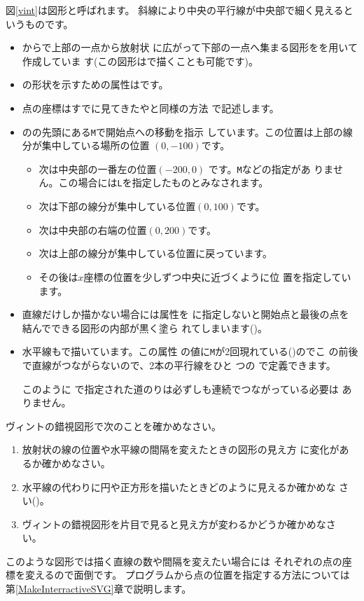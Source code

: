 図\ref{vint}は図形と呼ばれます。
斜線により中央の平行線が中央部で細く見えるというものです。
\begin{itemize}
 \item {}からで上部の一点から放射状
       に広がって下部の一点へ集まる図形をを用いて作成していま
       す(この図形はで描くことも可能です)。
 \item {}の形状を示すための属性はです。
 \item 点の座標はすでに見てきたやと同様の方法
       で記述します。
 \item {}のの先頭にある\texttt{M}で開始点への移動を指示
       しています。この位置は上部の線分が集中している場所の位置
       $(0,-100)$です。
\begin{itemize}
 \item 次は中央部の一番左の位置$(-200,0)$ です。\texttt{M}などの指定があ
       りません。この場合には\texttt{L}を指定したものとみなされます。
 \item 次は下部の線分が集中している位置$(0,100)$です。
 \item 次は中央部の右端の位置$(0,200)$です。
 \item 次は上部の線分が集中している位置に戻っています。
 \item その後は$x$座標の位置を少しずつ中央に近づくように位
       置を指定しています。
\end{itemize}
 \item 直線だけしか描かない場合には属性を
       に指定しないと開始点と最後の点を結んでできる図形の内部が黒く塗ら
       れてしまいます()。
       
 \item 水平線もで描いています。この属性
       の値に\texttt{M}が2回現れている()のでこ
       の前後で直線がつながらないので、2本の平行線をひと
       つの で定義できます。

このように で指定された道のりは必ずしも連続でつながっている必要は
ありません。
\end{itemize}
\begin{Problem}\upshape\label{vint-path}
 ヴィントの錯視図形で次のことを確かめなさい。
\begin{enumerate}
 \item 放射状の線の位置や水平線の間隔を変えたときの図形の見え方
       に変化があるか確かめなさい。
 \item 水平線の代わりに円や正方形を描いたときどのように見えるか確かめな
       さい(\cite[85ページ参照]{OIwCD})。
 \item ヴィントの錯視図形を片目で見ると見え方が変わるかどうか確かめなさ
       い。
\end{enumerate}
\end{Problem}
このような図形では描く直線の数や間隔を変えたい場合には
それぞれの点の座標を変えるので面倒です。
プログラムから点の位置を指定する方法については
第\ref{MakeInterractiveSVG}章で説明します。

